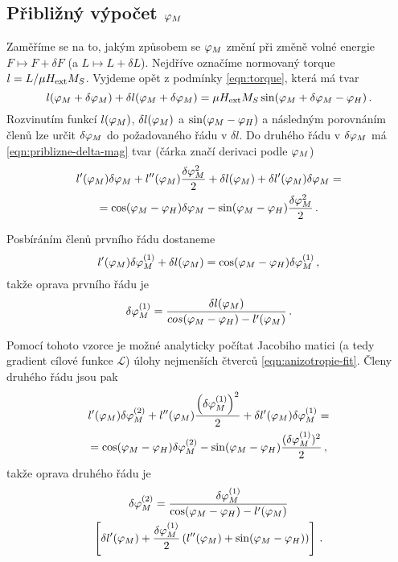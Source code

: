 \subsection*{Přibližný výpočet $\varphi_M$}

Zaměříme se na to, jakým způsobem se $\varphi_M$ změní při změně volné energie $F \mapsto F + \delta F$ (a $L \mapsto L+\delta L$).
Nejdříve označíme normovaný torque $l = L/\mu H_\textrm{ext} M_S$.
Vyjdeme opět z podmínky \eqref{eqn:torque}, která má tvar
\begin{equation}
    \label{eqn:priblizne-delta-mag}
 l(\varphi_M+\delta\varphi_M)+\delta l(\varphi_M+\delta\varphi_M) = \mu H_\textrm{ext} M_S \sin(\varphi_M+\delta \varphi_M-\varphi_H) \,.
\end{equation}
Rozvinutím funkcí $l(\varphi_M)$, $\delta l(\varphi_M)$ a $\sin(\varphi_M-\varphi_H)$ a následným porovnáním členů lze určit $\delta\varphi_M$ do požadovaného řádu v $\delta l$.
Do druhého řádu v $\delta \varphi_M$ má \eqref{eqn:priblizne-delta-mag} tvar (čárka značí derivaci podle $\varphi_M$)
\begin{multline}
    l'(\varphi_M)\delta\varphi_M+l''(\varphi_M)\frac{\delta\varphi_M^2}{2} + \delta l(\varphi_M) + \delta l' (\varphi_M)\delta\varphi_M = \\
    = \cos(\varphi_M-\varphi_H) \delta\varphi_M - \sin(\varphi_M-\varphi_H) \frac{\delta\varphi_M^2}{2} \,.
\end{multline}

Posbíráním členů prvního řádu dostaneme
\begin{equation}
    l'(\varphi_M)\delta\varphi_M^{(1)} + \delta l(\varphi_M) = \cos(\varphi_M-\varphi_H)\delta\varphi_M^{(1)} \,,
\end{equation}
takže oprava prvního řádu je
\begin{equation}
    \delta\varphi_M^{(1)} = \frac{\delta l(\varphi_M)}{cos(\varphi_M-\varphi_H)-l'(\varphi_M)} \,.
\end{equation}

Pomocí tohoto vzorce je možné analyticky počítat Jacobiho matici (a tedy gradient cílové funkce $\mathcal{L}$) úlohy nejmenších čtverců \eqref{eqn:anizotropie-fit}.
Členy druhého řádu jsou pak
\begin{multline}
    l'(\varphi_M)\delta\varphi_M^{(2)} +  l''(\varphi_M) \frac{\left(\delta\varphi_M^{(1)}\right)^2}{2} + \delta l'(\varphi_M)\delta\varphi_M^{(1)} = \\
    = \cos(\varphi_M-\varphi_H)\delta\varphi_M^{(2)} - \sin(\varphi_M-\varphi_H) \frac{(\delta\varphi_M^{(1)})^2}{2} \,,
\end{multline}
takže oprava druhého řádu je
\begin{multline}
    \delta\varphi_M^{(2)} = \frac{\delta\varphi_M^{(1)}}{\cos(\varphi_M-\varphi_H)-l'(\varphi_M)} \\ 
                      \left[ \delta l'(\varphi_M) + \frac{\delta\varphi_M^{(1)}}{2} \left( l''(\varphi_M)+\sin(\varphi_M-\varphi_H) \right)   \right] \,.
\end{multline}

